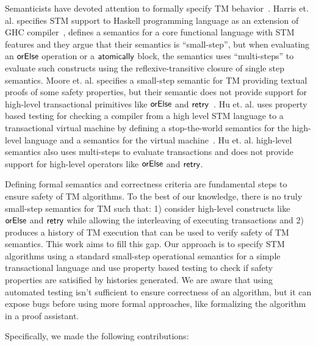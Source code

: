 \documentclass[sigplan, anonymous, review]{acmart}
\theoremstyle{definition}
\newcommand{\F}[1]{\green{\mathsf{#1}}}
\begin{document}
Semanticists have devoted attention to formally specify TM behavior~\cite{Moore2008,Koskinen2010,Abadi2011,Harris05}.
Harris et. al. specifies STM support to Haskell programming language as an extension of GHC compiler~\cite{Harris05},
defines a semantics for a core functional language with STM features and they argue that their semantics is ``small-step'',
but when evaluating an \ensuremath{\F{orElse}} operation or a \ensuremath{\F{atomically}} block, the semantics uses ``multi-steps'' to evaluate such constructs
using the reflexive-transitive closure of single step semantics. Moore et. al. specifies a small-step semantic for TM providing
textual proofs of some safety properties, but their semantic does not provide support for high-level transactional primitives
like \ensuremath{\F{orElse}} and \ensuremath{\F{retry}}~\cite{Moore2008}. Hu et. al. uses property based testing for checking a compiler from a high level
STM language to a transactional virtual machine by defining a stop-the-world semantics for the high-level language and a semantics
for the virtual machine~\cite{Hu08}. Hu et. al. high-level semantics also uses multi-steps to evaluate transactions and does not
provide support for high-level operators like \ensuremath{\F{orElse}} and \ensuremath{\F{retry}}.

Defining formal semantics and correctness criteria are fundamental steps to ensure safety of TM algorithms.
To the best of our knowledge, there is no truly small-step semantics for TM such that: 1) consider high-level constructs like \ensuremath{\F{orElse}}
and \ensuremath{\F{retry}} while allowing the interleaving of executing transactions and 2) produces a history of TM execution that can be used to verify
safety of TM semantics. This work aims to fill this gap. Our approach is to specify STM algorithms
using a standard small-step operational semantics
for a simple transactional language and use property based testing to check if safety properties are satisified by histories generated.
We are aware that using automated testing isn't sufficient to ensure correctness of an algorithm, but
it can expose bugs before using more formal approaches, like formalizing the algorithm in a proof assistant.

Specifically, we made the following contributions:
\end{document}
